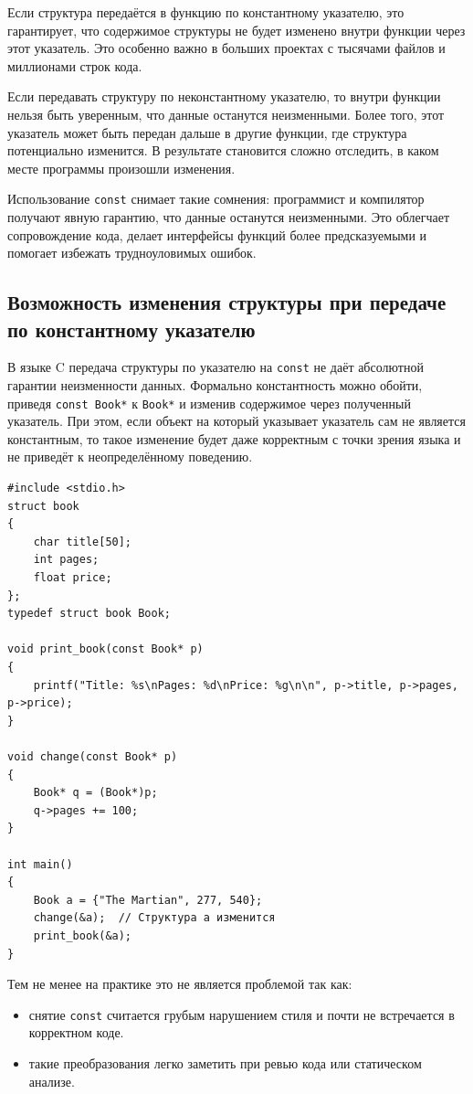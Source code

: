 \documentclass[10pt]{article}
\begin{document}
Если структура передаётся в функцию по константному указателю, это гарантирует, что содержимое структуры не будет изменено внутри функции через этот указатель. Это особенно важно в больших проектах с тысячами файлов и миллионами строк кода.

Если передавать структуру по неконстантному указателю, то внутри функции нельзя быть уверенным, что данные останутся неизменными. Более того, этот указатель может быть передан дальше в другие функции, где структура потенциально изменится. В результате становится сложно отследить, в каком месте программы произошли изменения.

Использование \texttt{const} снимает такие сомнения: программист и компилятор получают явную гарантию, что данные останутся неизменными. Это облегчает сопровождение кода, делает интерфейсы функций более предсказуемыми и помогает избежать трудноуловимых ошибок.

\subsection*{Возможность изменения структуры при передаче по константному указателю}
В языке C передача структуры по указателю на \texttt{const} не даёт абсолютной гарантии неизменности данных. Формально константность можно обойти, приведя \texttt{const Book*} к \texttt{Book*} и изменив содержимое через полученный указатель. При этом, если объект на который указывает указатель сам не является константным, то такое изменение будет даже корректным с точки зрения языка и не приведёт к неопределённому поведению.
\begin{lstlisting}
#include <stdio.h>
struct book 
{
    char title[50];
    int pages;
    float price;
};
typedef struct book Book;

void print_book(const Book* p) 
{
    printf("Title: %s\nPages: %d\nPrice: %g\n\n", p->title, p->pages, p->price);
}

void change(const Book* p) 
{
    Book* q = (Book*)p;
    q->pages += 100;
}

int main() 
{
    Book a = {"The Martian", 277, 540};
    change(&a);  // Структура a изменится
    print_book(&a);
}
\end{lstlisting}
Тем не менее на практике это не является проблемой так как:
\begin{itemize}
\item снятие \texttt{const} считается грубым нарушением стиля и почти не встречается в корректном коде.
\item такие преобразования легко заметить при ревью кода или статическом анализе.
\end{itemize}
\end{document}
